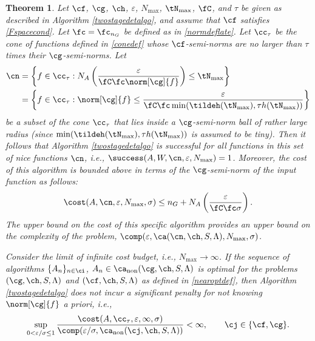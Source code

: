 \documentclass[]{elsarticle}
\DeclareMathOperator{\fix}{non}
\newtheorem{theorem}{Theorem}
\theoremstyle{definition}
\theoremstyle{remark}
\begin{document}
\begin{theorem}  \label{TwoStageDetermThm}  Let  $\cf$, $\cg$, $\ch$, $\varepsilon$, $N_{\max}$, $\tN_{\max}$, $\fC$, and $\tau$ be given as described in Algorithm \ref{twostagedetalgo}, and assume that $\cf$ satisfies \eqref{Fspacecond}.  Let $\fc=\fc_{n_G}$ be defined as in \eqref{normdeflate}.
Let $\cc_\tau$ be the cone of functions defined in \eqref{conedef} whose $\cf$-semi-norms are no larger than $\tau$ times their $\cg$-semi-norms.  Let
\begin{align} 
\nonumber
\cn &= \left \{ f \in \cc_\tau : N_{A}\left(\frac{\varepsilon}{\fC \fc \norm[\cg]{f}} \right) \le \tN_{\max} \right\} \\
\label{nicefdef}
&= \left \{ f \in \cc_\tau : \norm[\cg]{f} \le \frac{\varepsilon}{\fC \fc \min(\tildeh(\tN_{\max}),\tau h(\tN_{\max}))} \right\}
\end{align}
be a subset of the cone $\cc_\tau$ that lies inside a $\cg$-semi-norm ball of rather large radius (since $\min(\tildeh(\tN_{\max}),\tau h(\tN_{\max}))$ is assumed to be tiny).  Then it follows that Algorithm \ref{twostagedetalgo} is successful for all functions in this set of \emph{nice} functions $\cn$,  i.e.,  $\success(A,W,\cn,\varepsilon,N_{\max}) = 1$.  Moreover, the cost of this algorithm is bounded above in terms of the $\cg$-semi-norm of the input function as follows:
\begin{equation} \label{auto2stagedetcost}
\cost(A,\cn,\varepsilon,N_{\max},\sigma)
\le n_G+ N_{A}\left(\frac{\varepsilon}{\fC \fc \sigma} \right).
\end{equation}
The upper bound on the cost of this specific algorithm provides an upper bound on the complexity of the problem, $\comp(\varepsilon,\ca(\cn,\ch,S,\Lambda),N_{\max},\sigma)$.  

Consider the limit of infinite cost budget, i.e., $N_{\max} \to \infty$.  If the sequence of algorithms $\{A_n\}_{n \in \ci}$, $A_n \in\ca_{\fix}(\cg,\ch,S,\Lambda)$  is optimal for the problems $(\cg,\ch,S,\Lambda)$ and $(\cf,\ch,S,\Lambda)$ as defined in \eqref{nearoptdef}, then Algorithm \ref{twostagedetalgo} does not incur a significant penalty for not knowing $\norm[\cg]{f}$ a priori, i.e.,
\begin{equation} \label{penalty}
\sup_{0 < \varepsilon/\sigma \le 1} \frac{\cost(A,\cc_{\tau},\varepsilon,\infty,\sigma)} {\comp(\varepsilon/\sigma,\ca_{\fix}(\cj,\ch,S,\Lambda))} <\infty, \qquad \cj \in \{\cf,\cg\}.
\end{equation}
\end{theorem}
\end{document}
